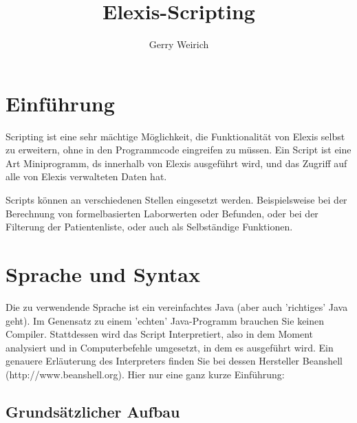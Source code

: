 \documentclass[a4paper]{scrartcl}
\begin{document}
\title{Elexis-Scripting}
\author{Gerry Weirich}
\maketitle

\section{Einführung}
Scripting ist eine sehr mächtige Möglichkeit, die Funktionalität von Elexis selbst zu erweitern, ohne in den Programmcode eingreifen zu müssen. Ein Script ist eine Art Miniprogramm, ds innerhalb von Elexis ausgeführt wird, und das Zugriff auf alle von Elexis verwalteten Daten hat.

\medskip

Scripts können an verschiedenen Stellen eingesetzt werden. Beispielsweise bei der Berechnung von formelbasierten Laborwerten oder Befunden, oder bei der Filterung der Patientenliste, oder auch als Selbständige Funktionen.

\section{Sprache und Syntax}
Die zu verwendende Sprache ist ein vereinfachtes Java (aber auch 'richtiges' Java geht). Im Genensatz zu einem 'echten' Java-Programm brauchen Sie keinen Compiler. Stattdessen wird das Script Interpretiert, also in dem Moment analysiert und in Computerbefehle umgesetzt, in dem es ausgeführt wird. Ein genauere Erläuterung des Interpreters finden Sie bei dessen Hersteller Beanshell (http://www.beanshell.org). Hier nur eine ganz kurze Einführung:

\subsection{Grundsätzlicher Aufbau}
\end{document}
